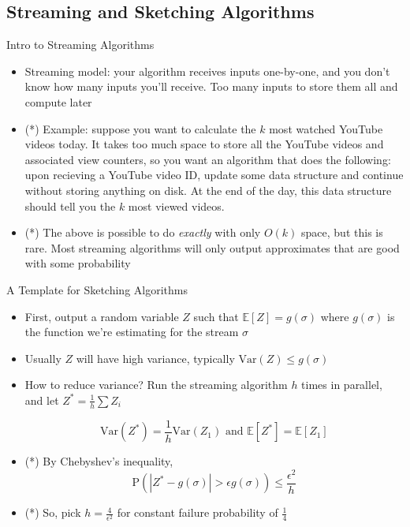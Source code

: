 \documentclass[aspectratio=169]{beamer}
\begin{document}
\subsection{Streaming and Sketching Algorithms}

\frame{\subsectionpage}

\begin{frame}{Intro to Streaming Algorithms}
\protect\hypertarget{intro-to-streaming-algorithms}{}
\begin{itemize}
\tightlist
\item
  Streaming model: your algorithm receives inputs one-by-one, and you
  don't know how many inputs you'll receive. Too many inputs to store
  them all and compute later \pause
\item
  (*) Example: suppose you want to calculate the \(k\) most watched YouTube
  videos today. It takes too much space to store all the YouTube videos
  and associated view counters, so you want an algorithm that does the
  following: upon recieving a YouTube video ID, update some data
  structure and continue without storing anything on disk. At the end of
  the day, this data structure should tell you the \(k\) most viewed
  videos. \pause
\item
  (*) The above is possible to do \emph{exactly} with only \(O(k)\) space,
  but this is rare. Most streaming algorithms will only output
  approximates that are good with some probability
\end{itemize}
\end{frame}

\begin{frame}{A Template for Sketching Algorithms}
\protect\hypertarget{a-template-for-sketching-algorithms}{}
\begin{itemize}
\tightlist
\item
  First, output a random variable \(Z\) such that
  \(\mathbb{E}[Z] = g(\sigma)\) where \(g(\sigma)\) is the function
  we're estimating for the stream \(\sigma\)
\item
  Usually \(Z\) will have high variance, typically
  \(\text{Var}(Z) \leq g(\sigma)\)
\item
  How to reduce variance? Run the streaming algorithm \(h\) times in
  parallel, and let \(Z^* = \frac{1}{h}\sum Z_i\)

\[\text{Var}(Z^*) = \frac{1}{h}\text{Var}(Z_1) \text{ and }\mathbb{E}[Z^*] = \mathbb{E}[Z_1]\]
\tightlist
\item
  (*) By Chebyshev's inequality,
  \[\text{P}\left(|Z^* - g(\sigma)| > \epsilon g(\sigma) \right) \leq \frac{\epsilon^2}{h} \]
\item
  (*) So, pick \(h = \frac{4}{\epsilon^2}\) for constant failure
  probability of \(\frac{1}{4}\)
\end{itemize}
\end{frame}
\end{document}
